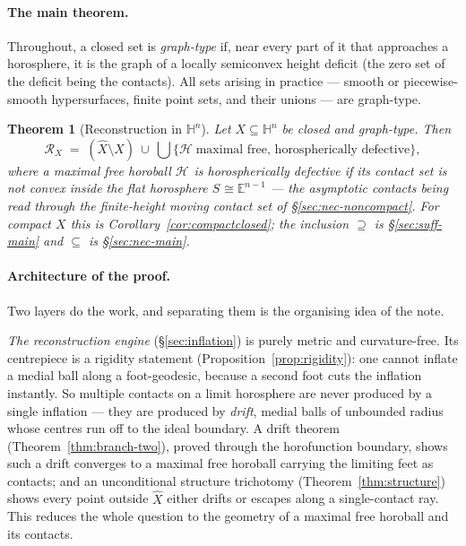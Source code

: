 \documentclass[11pt]{article}
\newtheorem{theorem}{Theorem}[section]
\theoremstyle{remark}
\newcommand{\X}{X}
\newcommand{\Xhat}{\widehat{\X}}
\newcommand{\Rx}{\mathcal{R}_{\X}}
\newcommand{\Hb}[1]{\mathcal{H}_{#1}}
\newcommand{\Sb}[1]{S_{#1}}
\begin{document}
\paragraph{The main theorem.} Throughout, a closed set is
\emph{graph-type} if, near every part of it that approaches a horosphere,
it is the graph of a locally semiconvex height deficit (the zero set of
the deficit being the contacts). All sets arising in practice --- smooth
or piecewise-smooth hypersurfaces, finite point sets, and their unions
--- are graph-type.

\begin{theorem}[Reconstruction in $\mathbb{H}^{n}$]\label{thm:main}
Let $\X\subseteq\mathbb{H}^{n}$ be closed and graph-type. Then
\[
  \Rx \;=\; (\Xhat\setminus\X)\ \cup\
  \bigcup\bigl\{\Hb{}\ \text{maximal free, horospherically defective}\bigr\},
\]
where a maximal free horoball $\Hb{}$ is \emph{horospherically defective}
if its contact set is not convex inside the flat horosphere
$\Sb{}\cong\mathbb{E}^{n-1}$ --- the asymptotic contacts being read
through the finite-height moving contact set of
\S\ref{sec:nec-noncompact}. For compact $\X$ this is
Corollary~\ref{cor:compactclosed}; the inclusion $\supseteq$ is
\S\ref{sec:suff-main} and $\subseteq$ is \S\ref{sec:nec-main}.
\end{theorem}

\paragraph{Architecture of the proof.} Two layers do the work, and
separating them is the organising idea of the note.

\emph{The reconstruction engine} (\S\ref{sec:inflation}) is purely
metric and curvature-free. Its centrepiece is a rigidity statement
(Proposition~\ref{prop:rigidity}): one cannot inflate a medial ball along
a foot-geodesic, because a second foot cuts the inflation instantly. So
multiple contacts on a limit horosphere are never produced by a single
inflation --- they are produced by \emph{drift}, medial balls of
unbounded radius whose centres run off to the ideal boundary. A drift
theorem (Theorem~\ref{thm:branch-two}), proved through the horofunction
boundary, shows such a drift converges to a maximal free horoball
carrying the limiting feet as contacts; and an unconditional structure
trichotomy (Theorem~\ref{thm:structure}) shows every point outside
$\Xhat$ either drifts or escapes along a single-contact ray. This reduces
the whole question to the geometry of a maximal free horoball and its
contacts.
\end{document}
